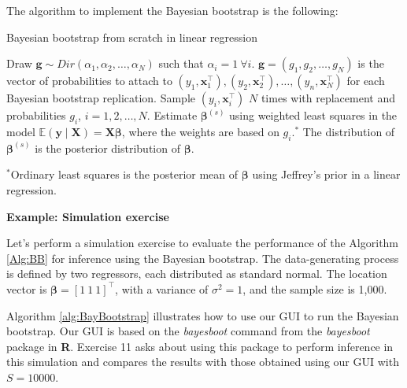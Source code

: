 The algorithm to implement the Bayesian bootstrap is the following:
\begin{algorithm}[!h]
	\caption{Bayesian bootstrap from scratch in linear regression}
	\label{Alg:BB}
	\begin{algorithmic}[1]
		\State Draw $\bm{g}\sim Dir(\alpha_1,\alpha_2,\dots,\alpha_N)$ such that $\alpha_i=1 \ \forall i$.
		\State $\bm{g}=(g_1,g_2,\dots,g_N)$ is the vector of probabilities to attach to $(y_1,\bm{x}_1^{\top}),(y_2,\bm{x}_2^{\top}),\dots,(y_n,\bm{x}_N^{\top})$ for each Bayesian bootstrap replication.
			\State Sample $(y_i,\bm{x}_i^{\top})$ $N$ times with replacement and probabilities $g_i$, $i=1,2,\dots,N$.
			\State Estimate $\bm{\beta}^{(s)}$ using weighted least squares in the model $\mathbb{E}(\bm{y}\mid \bm{X})=\bm{X}\bm{\beta}$, where the weights are based on $g_i$.$^*$ 
		\EndFor
		\State The distribution of $\bm{\beta}^{(s)}$ is the posterior distribution of $\bm{\beta}$.		
	\end{algorithmic}
	$^*${\footnotesize{Ordinary least squares is the posterior mean of $\bm{\beta}$ using Jeffrey's prior in a linear regression.}}
\end{algorithm}

\textbf{Example: Simulation exercise}

Let's perform a simulation exercise to evaluate the performance of the Algorithm \ref{Alg:BB} for inference using the Bayesian bootstrap. The data-generating process is defined by two regressors, each distributed as standard normal. The location vector is $\bm{\beta} = \left[1 \ 1 \ 1\right]^{\top}$, with a variance of $\sigma^2 = 1$, and the sample size is 1,000.

Algorithm \ref{alg:BayBootstrap} illustrates how to use our GUI to run the Bayesian bootstrap. Our GUI is based on the \textit{bayesboot} command from the \textit{bayesboot} package in \textbf{R}. Exercise 11 asks about using this package to perform inference in this simulation and compares the results with those obtained using our GUI with $S = 10000$.

